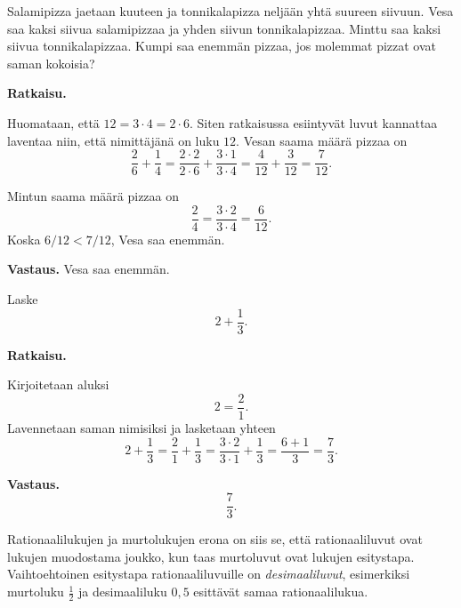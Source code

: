     \begin{esimerkki}
        Salamipizza jaetaan kuuteen ja tonnikalapizza neljään yhtä suureen
        siivuun. Vesa saa kaksi siivua salamipizzaa ja yhden siivun tonnikalapizzaa.
        Minttu saa kaksi siivua tonnikalapizzaa. Kumpi saa enemmän pizzaa, jos
        molemmat pizzat ovat saman kokoisia?
        
        
        \textbf{Ratkaisu.}
        
        Huomataan, että $12 = 3\cdot 4 = 2\cdot 6$. Siten ratkaisussa esiintyvät
        luvut kannattaa laventaa niin, että nimittäjänä on luku $12$. Vesan saama
        määrä pizzaa on
        \[
            \frac{2}{6} + \frac{1}{4} = 
            \frac{2\cdot 2}{2\cdot 6} + \frac{3\cdot 1}{3\cdot 4} =
            \frac{4}{12}+\frac{3}{12} =
            \frac{7}{12}.
        \]
        
        Mintun saama määrä pizzaa on
        \[
            \frac{2}{4} =
            \frac{3\cdot 2}{3\cdot 4} =
            \frac{6}{12}.
        \]
        Koska $6/12 < 7/12$, Vesa saa enemmän.
        
        \textbf{Vastaus.} Vesa saa enemmän.
    \end{esimerkki}
    
    
    \begin{esimerkki}
        Laske
        \[
            2 + \frac{1}{3}.
        \]
        
        \textbf{Ratkaisu.}
        
        Kirjoitetaan aluksi
        \[
            2=\frac{2}{1}.
        \]
        Lavennetaan saman nimisiksi ja lasketaan yhteen
        \[
            2 + \frac{1}{3} =
            \frac{2}{1} + \frac{1}{3} =
            \frac{3 \cdot 2}{3 \cdot 1} + \frac{1}{3} =
            \frac{6+1}{3} =
            \frac{7}{3}.
        \]
        
        \textbf{Vastaus.}
        \[
            \frac{7}{3}.
        \]
    \end{esimerkki}
    
    Rationaalilukujen ja murtolukujen erona on siis se, että rationaaliluvut
    ovat lukujen muodostama joukko, kun taas murtoluvut ovat lukujen esitystapa.
    Vaihtoehtoinen esitystapa rationaaliluvuille on \emph{desimaaliluvut},
    esimerkiksi murtoluku $\frac{1}{2}$ ja desimaaliluku $0,5$
    esittävät samaa rationaalilukua.
    
